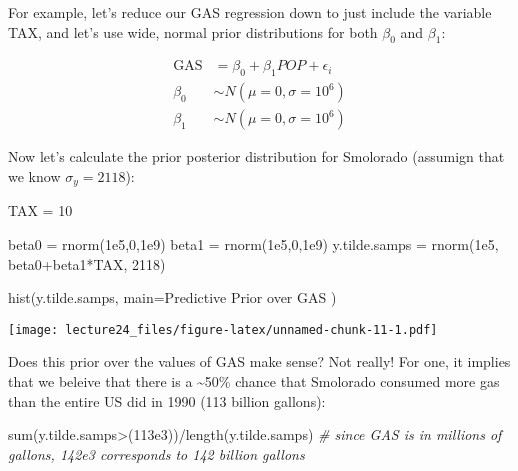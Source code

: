 \documentclass[
]{article}
\newenvironment{Shaded}{\begin{snugshade}}{\end{snugshade}}
\newcommand{\AttributeTok}[1]{\textcolor[rgb]{0.77,0.63,0.00}{#1}}
\newcommand{\CommentTok}[1]{\textcolor[rgb]{0.56,0.35,0.01}{\textit{#1}}}
\newcommand{\DecValTok}[1]{\textcolor[rgb]{0.00,0.00,0.81}{#1}}
\newcommand{\FloatTok}[1]{\textcolor[rgb]{0.00,0.00,0.81}{#1}}
\newcommand{\FunctionTok}[1]{\textcolor[rgb]{0.00,0.00,0.00}{#1}}
\newcommand{\NormalTok}[1]{#1}
\newcommand{\OtherTok}[1]{\textcolor[rgb]{0.56,0.35,0.01}{#1}}
\newcommand{\SpecialCharTok}[1]{\textcolor[rgb]{0.00,0.00,0.00}{#1}}
\newcommand{\StringTok}[1]{\textcolor[rgb]{0.31,0.60,0.02}{#1}}
\begin{document}
For example, let's reduce our GAS regression down to just include the
variable TAX, and let's use wide, normal prior distributions for both
\(\beta_0\) and \(\beta_1\):

\[
\begin{split}
\text{GAS} &= \beta_0 + \beta_1 POP + \epsilon_i\\
\beta_0 &\sim N(\mu=0, \sigma=10^6)\\
\beta_1 &\sim N(\mu=0, \sigma=10^6)
\end{split}
\]

Now let's calculate the prior posterior distribution for Smolorado
(assumign that we know \(\sigma_y = 2118\)):

\begin{Shaded}
\begin{Highlighting}[]
\NormalTok{TAX }\OtherTok{=} \DecValTok{10}

\NormalTok{beta0 }\OtherTok{=} \FunctionTok{rnorm}\NormalTok{(}\FloatTok{1e5}\NormalTok{,}\DecValTok{0}\NormalTok{,}\FloatTok{1e9}\NormalTok{)}
\NormalTok{beta1 }\OtherTok{=} \FunctionTok{rnorm}\NormalTok{(}\FloatTok{1e5}\NormalTok{,}\DecValTok{0}\NormalTok{,}\FloatTok{1e9}\NormalTok{)}
\NormalTok{y.tilde.samps }\OtherTok{=} \FunctionTok{rnorm}\NormalTok{(}\FloatTok{1e5}\NormalTok{, beta0}\SpecialCharTok{+}\NormalTok{beta1}\SpecialCharTok{*}\NormalTok{TAX, }\DecValTok{2118}\NormalTok{)}

\FunctionTok{hist}\NormalTok{(y.tilde.samps, }\AttributeTok{main=}\StringTok{\textquotesingle{}Predictive Prior over GAS\textquotesingle{}}\NormalTok{ )}
\end{Highlighting}
\end{Shaded}

\texttt{[image: lecture24\_files/figure-latex/unnamed-chunk-11-1.pdf]}

Does this prior over the values of GAS make sense? Not really! For one,
it implies that we beleive that there is a \textasciitilde50\% chance
that Smolorado consumed more gas than the entire US did in 1990 (113
billion gallons):

\begin{Shaded}
\begin{Highlighting}[]
\FunctionTok{sum}\NormalTok{(y.tilde.samps}\SpecialCharTok{\textgreater{}}\NormalTok{(}\FloatTok{113e3}\NormalTok{))}\SpecialCharTok{/}\FunctionTok{length}\NormalTok{(y.tilde.samps) }\CommentTok{\# since GAS is in millions of gallons, 142e3 corresponds to 142 billion gallons}
\end{Highlighting}
\end{Shaded}
\end{document}
